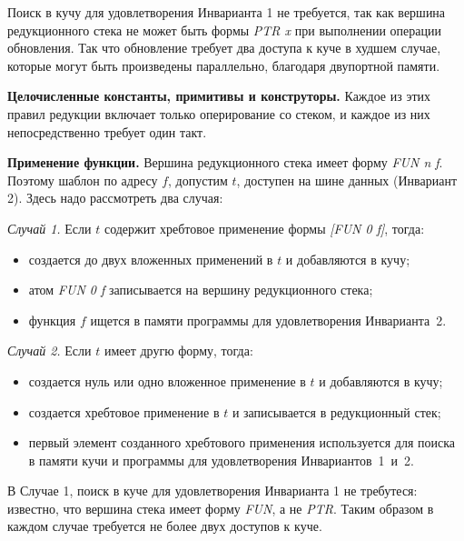 \documentclass[flenqn, 14pt]{extarticle}
\begin{document}
Поиск в кучу для удовлетворения Инварианта 1 не требуется, так как вершина редукционного стека не может быть формы \textit{PTR x} при выполнении операции обновления. Так что обновление требует два доступа к куче в худшем случае, которые могут быть произведены параллельно, благодаря двупортной памяти.

\textbf{Целочисленные константы, примитивы и конструторы.} Каждое из этих правил редукции включает только оперирование со стеком, и каждое из них непосредственно требует один такт.

\textbf{Применение функции.} Вершина редукционного стека имеет форму \textit{FUN n f}. Поэтому шаблон по адресу $f$, допустим $t$, доступен на шине данных (Инвариант 2). Здесь надо рассмотреть два случая:

\textit{Случай 1.} Если $t$ содержит хребтовое применение формы \textit{[FUN 0 f]}, тогда:
\begin{itemize}
\item создается до двух вложенных применений в $t$ и добавляются в кучу;
\item атом \textit{FUN 0 f} записывается на вершину редукционного стека;
\item функция $f$ ищется в памяти программы для удовлетворения Инварианта~2.
\end{itemize}

\textit{Случай 2.} Если $t$ имеет другю форму, тогда:
\begin{itemize}
\item создается нуль или одно вложенное применение в $t$ и добавляются в кучу;
\item создается хребтовое применение в $t$ и записывается в редукционный стек;
\item первый элемент созданного хребтового применения используется для поиска в памяти кучи и программы для удовлетворения Инвариантов~1~и~2.
\end{itemize}

В Случае 1, поиск в куче для удовлетворения Инварианта 1 не требутеся: известно, что вершина стека имеет форму \textit{FUN}, а не \textit{PTR}. Таким образом в каждом случае требуется не более двух доступов к куче.
\end{document}
